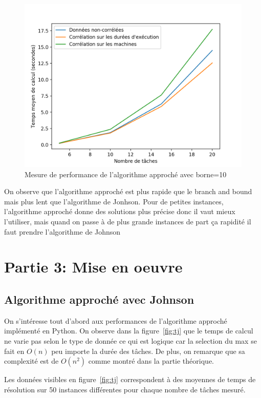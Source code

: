 \documentclass[a4paper, 10pt]{article}
\begin{document}
{    \begin{figure}[H]
		\centering
		\includegraphics[width=0.85\linewidth]{graphes/branch_and_greed.png}
		\caption{Mesure de performance de l'algorithme approché avec borne=10}
		\label{fig:bag}
    \end{figure}
    On observe que l'algorithme approché est plus rapide que le branch and bound mais plus lent que l'algorithme de Jonhson. Pour de petites instances, l'algorithme approché donne des solutions plus précise donc il vaut mieux l'utiliser, mais quand on passe à de plus grande instances de part ça rapidité il faut prendre l'algorithme de Johnson
}
	
	\section*{Partie 3: Mise en oeuvre}
		\subsection*{Algorithme approché avec Johnson}
		
		On s'intéresse tout d'abord aux performances de l'algorithme approché implémenté en Python. On observe dans la figure~\ref{fig:tj} que le temps de calcul ne varie pas selon le type de donnée ce qui est logique car la selection du max se fait en $O(n)$ peu importe la durée des tâches. De plus, on remarque que sa complexité est de $O(n^2)$ comme montré dans la partie théorique.
		
		Les données visibles en figure~\ref{fig:tj} correspondent à des moyennes de temps de résolution sur 50 instances différentes pour chaque nombre de tâches mesuré.
		
\end{document}
